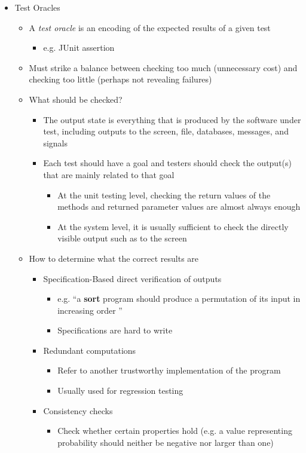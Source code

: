\begin{itemize}
	\item Test Oracles
	\begin{itemize}
		\item A \textit{test oracle} is an encoding of the expected results of a given test
		\begin{itemize}
			\item e.g. JUnit assertion
		\end{itemize}
		\item Must strike a balance between checking too much (unnecessary cost) and checking too little (perhaps not revealing failures)
		\item What should be checked?
		\begin{itemize}
			\item The output state is everything that is produced by the software under test, including outputs to the screen, file, databases, messages, and signals
			\item Each test should have a goal and testers should check the output(s) that are mainly related to that goal
			\begin{itemize}
				\item At the unit testing level, checking the return values of the methods and returned parameter values are almost always enough
				\item At the system level, it is usually sufficient to check the directly visible output such as to the screen
			\end{itemize}
		\end{itemize}

		\item How to determine what the correct results are
		\begin{itemize}
			\item Specification-Based direct verification of outputs
			\begin{itemize}
				\item e.g. “a \textbf{sort} program should produce a permutation of its input in increasing order ”
				\item Specifications are hard to write
			\end{itemize}
			\item Redundant computations
			\begin{itemize}
				\item Refer to another trustworthy implementation of the program
				\item Usually used for regression testing
			\end{itemize}
			\item Consistency checks
			\begin{itemize}
				\item Check whether certain properties hold (e.g. a value representing probability
				should neither be negative nor larger than one)
			\end{itemize}
		\end{itemize}
	\end{itemize}
\end{itemize}
